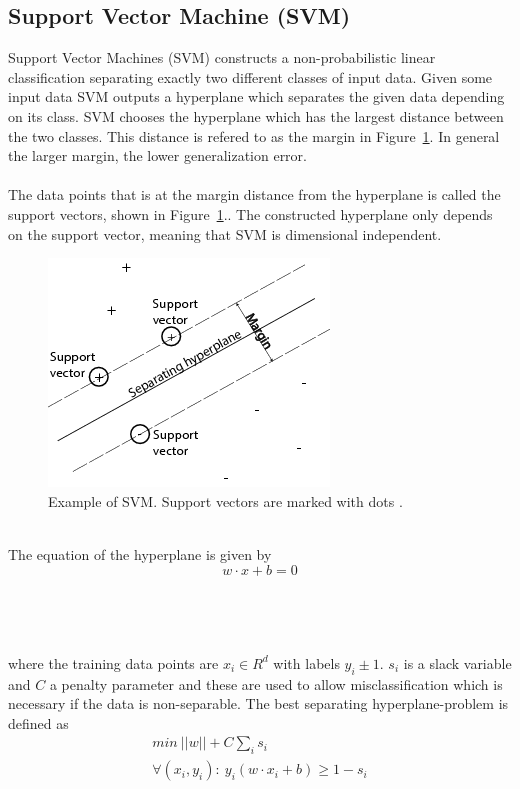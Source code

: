 \subsection{Support Vector Machine (SVM)}
Support Vector Machines (SVM) constructs a non-probabilistic linear classification separating exactly two different classes of input data. Given some input data SVM outputs a hyperplane which separates the given data depending on its class. SVM chooses the hyperplane which has the largest distance between the two classes. This distance is refered to as the margin in Figure~\ref{fig:svm}. In general the larger margin, the lower generalization error. \citep{svm_ai} \\\\
The data points that is at the margin distance from the hyperplane is called the support vectors, shown in Figure~\ref{fig:svm}.. The constructed hyperplane only depends on the support vector, meaning that SVM is dimensional independent.
\begin{figure}[h!]
\centering
\includegraphics[scale = 0.7]{../Plottar/svmhyperplane.png}
\caption{Example of SVM. Support vectors are marked with dots \citep{svm_picture}. }
\label{fig:svm}
\end{figure} \\
The equation of the hyperplane is given by
\begin{equation}
w \cdot x + b = 0
\end{equation}\\\\\\\\
where the training data points are $x_i \in R^d$ with labels $y_i \pm 1$. $s_i$ is a slack variable and $C$ a penalty parameter and these are used to allow misclassification which is necessary if the data is non-separable. The best separating hyperplane-problem is defined as
\begin{equation}
\begin{array}{l}
min \: ||w|| + C \sum_{i} s_i \\
\forall (x_i, y_i) : \: y_i(w \cdot x_i + b) \geq 1 - s_i
\end{array}
\end{equation}
